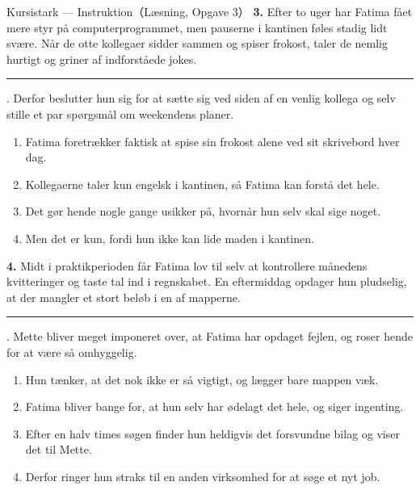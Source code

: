 \begin{emailbox}{Kursistark --- Instruktion（Læsning, Opgave 3）}
\vspace{0.4em}
\textbf{3.} Efter to uger har Fatima fået mere styr på computerprogrammet, men pauserne i kantinen føles stadig lidt svære. Når de otte kollegaer sidder sammen og spiser frokost, taler de nemlig hurtigt og griner af indforståede jokes. \rule{3.2cm}{0.4pt}. Derfor beslutter hun sig for at sætte sig ved siden af en venlig kollega og selv stille et par spørgsmål om weekendens planer.
\begin{enumerate}[label=\textbf{\Alph*.}, leftmargin=1.8em, itemsep=0.12em, topsep=0.25em]
  \item Fatima foretrækker faktisk at spise sin frokost alene ved sit skrivebord hver dag.
  \item Kollegaerne taler kun engelsk i kantinen, så Fatima kan forstå det hele.
  \item Det gør hende nogle gange usikker på, hvornår hun selv skal sige noget.
  \item Men det er kun, fordi hun ikke kan lide maden i kantinen.
\end{enumerate}

\vspace{0.4em}
\textbf{4.} Midt i praktikperioden får Fatima lov til selv at kontrollere månedens kvitteringer og taste tal ind i regnskabet. En eftermiddag opdager hun pludselig, at der mangler et stort beløb i en af mapperne. \rule{3.2cm}{0.4pt}. Mette bliver meget imponeret over, at Fatima har opdaget fejlen, og roser hende for at være så omhyggelig.
\begin{enumerate}[label=\textbf{\Alph*.}, leftmargin=1.8em, itemsep=0.12em, topsep=0.25em]
  \item Hun tænker, at det nok ikke er så vigtigt, og lægger bare mappen væk.
  \item Fatima bliver bange for, at hun selv har ødelagt det hele, og siger ingenting.
  \item Efter en halv times søgen finder hun heldigvis det forsvundne bilag og viser det til Mette.
  \item Derfor ringer hun straks til en anden virksomhed for at søge et nyt job.
\end{enumerate}


\end{emailbox}
